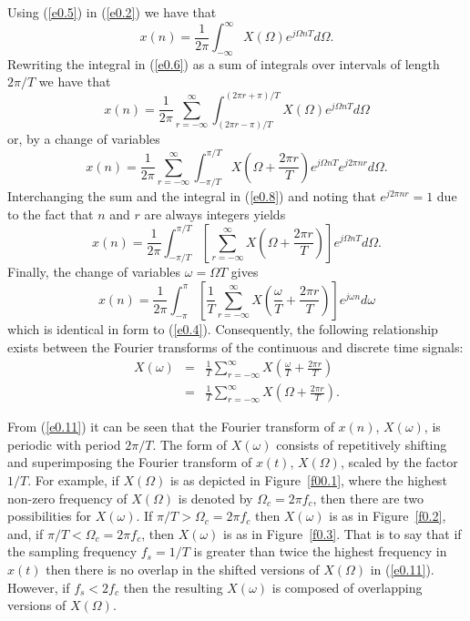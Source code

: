 	Using (\ref{e0.5}) in (\ref{e0.2}) we have that
%
\begin{equation}
x(n)=\frac{1}{2\pi}\int_{-\infty}^{\infty}X(\Omega)e^{j\Omega nT}d\Omega.
\label{e0.6}
\end{equation}
%
Rewriting the integral in (\ref{e0.6}) as a sum of integrals
over intervals of length $2\pi/T$ we have that
%
\begin{equation}
x(n)=\frac{1}{2\pi}\sum_{r=-\infty}^{\infty}
     \int_{(2\pi r -\pi)/T}^{(2\pi r +\pi)/T}
         X(\Omega)e^{j\Omega nT}d\Omega
\label{e0.7}
\end{equation}
%
or, by a change of variables
%
\begin{equation}
x(n)=\frac{1}{2\pi}\sum_{r=-\infty}^{\infty}
     \int_{-\pi/T}^{\pi/T}
         X(\Omega+\frac{2\pi r}{T})e^{j\Omega nT}e^{j2\pi nr}d\Omega.
\label{e0.8}
\end{equation}
%
Interchanging the sum and the integral in (\ref{e0.8}) and 
noting that $e^{j2\pi nr}=1$ due to the fact that $n$ and $r$
are always integers yields
%
\begin{equation}
x(n)=\frac{1}{2\pi}\int_{-\pi/T}^{\pi/T}
      [\sum_{r=-\infty}^{\infty}
         X(\Omega+\frac{2\pi r}{T})]e^{j\Omega nT}d\Omega.
\label{e0.9}
\end{equation}
%
Finally, the change of variables $\omega=\Omega T$ gives
%
\begin{equation}
x(n)=\frac{1}{2\pi}\int_{-\pi}^{\pi}
      [\frac{1}{T}\sum_{r=-\infty}^{\infty}
         X(\frac{\omega}{T}+\frac{2\pi r}{T})]e^{j\omega n}d\omega
\label{e0.10}
\end{equation}
%
which is identical in form to (\ref{e0.4}).  Consequently,
the following relationship exists between the
Fourier transforms of the continuous and discrete
time signals:
%
\begin{eqnarray}
X(\omega)&=&\frac{1}{T}\sum_{r=-\infty}^{\infty}
         X(\frac{\omega}{T}+\frac{2\pi r}{T})\nonumber\\
         &=&\frac{1}{T}\sum_{r=-\infty}^{\infty}
         X(\Omega+\frac{2\pi r}{T}).
\label{e0.11}
\end{eqnarray}
%

	From (\ref{e0.11}) it can be seen that
the Fourier transform of $x(n)$, $X(\omega)$, is 
periodic with period $2\pi/T$.  The form of $X(\omega)$ consists of
repetitively shifting and superimposing the Fourier transform of 
$x(t)$, $X(\Omega)$, scaled by the factor $1/T$.  For example,
if $X(\Omega)$ is as depicted in Figure~\ref{f00.1}, where the
highest non-zero frequency of $X(\Omega)$ is denoted by $\Omega_c=2\pi f_c$,
then there are two possibilities for $X(\omega)$.  If
$\pi/T>\Omega_c=2\pi f_c$ then $X(\omega)$ is as in Figure~\ref{f0.2},
 and, if $\pi/T<\Omega_c=2\pi f_c$, then $X(\omega)$ is as in
Figure~\ref{f0.3}.  That is to say that if the sampling frequency 
$f_s=1/T$ is greater
than twice the highest frequency in $x(t)$ then there is
no overlap in the shifted versions of $X(\Omega)$
in (\ref{e0.11}).  However, if $f_s<2f_c$ then the resulting 
$X(\omega)$ is composed of overlapping versions of $X(\Omega)$.


